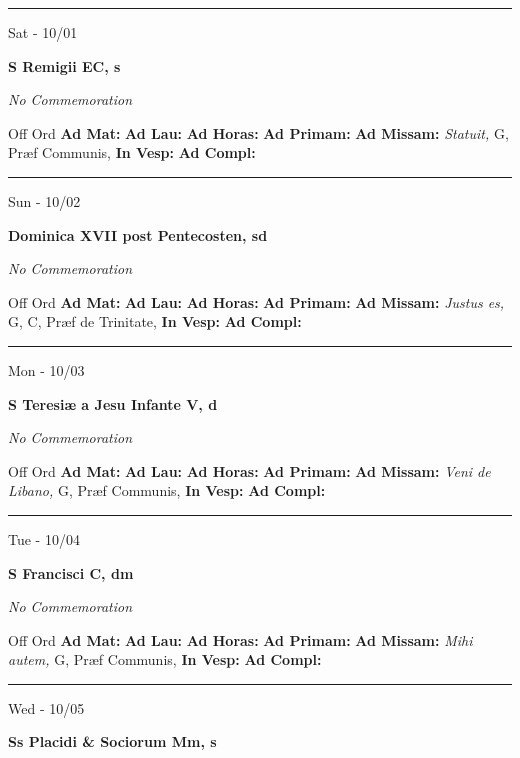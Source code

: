 \documentclass[letterpaper, 10pt]{article}
\begin{document}
\hrule
\begin{center}
Sat - 10/01
\end{center}\textbf{ \large S Remigii EC, \textnormal{\normalsize s}}

\textit{No Commemoration}\begin{justify}
Off Ord
\textbf{Ad Mat: }
\textbf{Ad Lau: }
\textbf{Ad Horas: }
\textbf{Ad Primam: }
\textbf{Ad Missam:} \textit{Statuit, } G, Præf Communis, 
\textbf{In Vesp: }
\textbf{Ad Compl: }\end{justify}



\hrule
\begin{center}
Sun - 10/02
\end{center}\textbf{ \large Dominica XVII post Pentecosten, \textnormal{\normalsize sd}}

\textit{No Commemoration}\begin{justify}
Off Ord
\textbf{Ad Mat: }
\textbf{Ad Lau: }
\textbf{Ad Horas: }
\textbf{Ad Primam: }
\textbf{Ad Missam:} \textit{Justus es, } G, C, Præf de Trinitate, 
\textbf{In Vesp: }
\textbf{Ad Compl: }\end{justify}



\hrule
\begin{center}
Mon - 10/03
\end{center}\textbf{ \large S Teresiæ a Jesu Infante V, \textnormal{\normalsize d}}

\textit{No Commemoration}\begin{justify}
Off Ord
\textbf{Ad Mat: }
\textbf{Ad Lau: }
\textbf{Ad Horas: }
\textbf{Ad Primam: }
\textbf{Ad Missam:} \textit{Veni de Libano, } G, Præf Communis, 
\textbf{In Vesp: }
\textbf{Ad Compl: }\end{justify}



\hrule
\begin{center}
Tue - 10/04
\end{center}\textbf{ \large S Francisci C, \textnormal{\normalsize dm}}

\textit{No Commemoration}\begin{justify}
Off Ord
\textbf{Ad Mat: }
\textbf{Ad Lau: }
\textbf{Ad Horas: }
\textbf{Ad Primam: }
\textbf{Ad Missam:} \textit{Mihi autem, } G, Præf Communis, 
\textbf{In Vesp: }
\textbf{Ad Compl: }\end{justify}



\hrule
\begin{center}
Wed - 10/05
\end{center}\textbf{ \large Ss Placidi \& Sociorum Mm, \textnormal{\normalsize s}}
\end{document}
